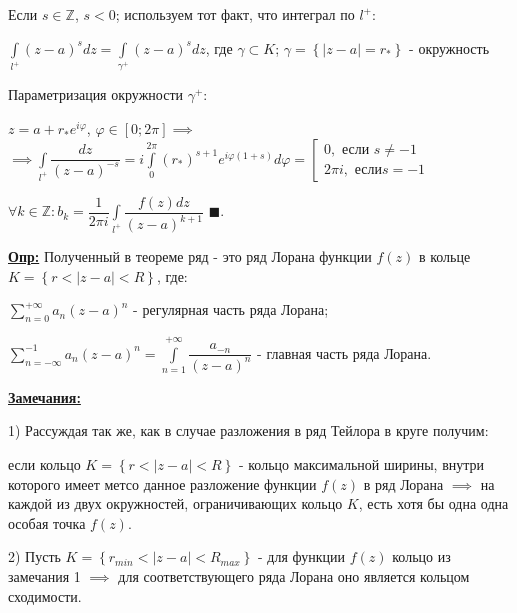 \documentclass[a4paper, 12pt]{article}
\begin{document}
  \quad Если $s \in \mathbb{Z}$, $s < 0$; используем тот факт, что интеграл по $l^+$:

  \begin{center}
    $\displaystyle\int\limits_{l^+} (z-a)^s dz = \displaystyle\int\limits_{\gamma^+} (z-a)^s dz$, где $\gamma \subset K$; $\gamma = \left\{ |z-a| = r_{*} \right\}$ - окружность
  \end{center}

  \quad Параметризация окружности $\gamma^+$:

  \begin{center}
    $z = a + r_{*} e^{i\varphi}$, $\varphi \in [0; 2\pi] \implies$ 
    $\implies \displaystyle\int\limits_{l^+} \dfrac{dz}{(z-a)^{-s}} = i \displaystyle\int\limits_{0}^{2\pi} (r_{*})^{s+1} e^{i\varphi (1+s)} d\varphi = \left[
    \begin{array}{c}
      0, \text{ если } s \neq -1 \\
      2 \pi i, \text{ если} s = -1
    \end{array}
  \right.$

    $\forall k \in \mathbb{Z} : b_k = \dfrac{1}{2 \pi i} \displaystyle\int\limits_{l^+} \dfrac{f(z) dz}{(z-a)^{k+1}}$ $\blacksquare$.
  \end{center}
  
  \quad \textbf{\underline{Опр:}} Полученный в теореме ряд - это ряд Лорана функции $f(z)$ в кольце $K = \left\{ r < |z - a| < R \right\}$, где:

  \begin{center}
    $\displaystyle\sum\limits_{n=0}^{+\infty} a_n (z-a)^n $ - регулярная часть ряда Лорана;

    $\displaystyle\sum\limits_{n=-\infty}^{-1} a_n (z-a)^n = \displaystyle\int\limits_{n=1}^{+\infty}\dfrac{a_{-n}}{(z-a)^n}$ - главная часть ряда Лорана. 
  \end{center}

  \quad \textbf{\underline{Замечания:}}

  1) Рассуждая так же, как в случае разложения в ряд Тейлора в круге получим:

  \quad если кольцо $K = \left\{ r < |z - a| < R \right\}$ - кольцо максимальной ширины, внутри которого имеет метсо данное разложение функции $f(z)$ в ряд Лорана $\implies$ на каждой из двух окружностей, ограничивающих кольцо $K$, есть хотя бы одна одна особая точка $f(z)$.

  2) Пусть $K = \left\{ r_{min} < |z - a| < R_{max}  \right\}$ - для функции $f(z)$ кольцо из замечания 1 $\implies$ для соответствующего ряда Лорана оно является кольцом сходимости.
  
\end{document}
